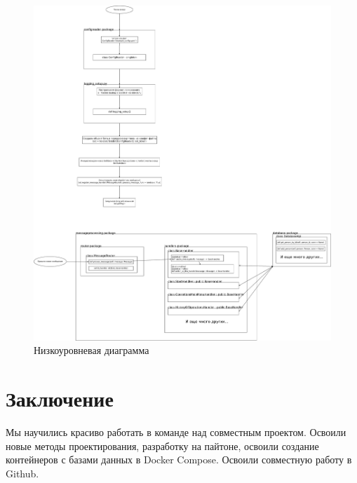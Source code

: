 \documentclass[12pt]{extarticle}
\begin{document}
\begin{figure}[!htb]
    \caption{Низкоуровневая диаграмма}
    \centering
    \includegraphics[scale=0.1]{Code_level.png}
\end{figure}

\pagebreak

\section{Заключение}
Мы научились красиво работать в команде над совместным проектом. Освоили новые методы проектирования, разработку на пайтоне, освоили создание контейнеров с базами данных в Docker Compose. Освоили совместную работу в Github.
\end{document}
